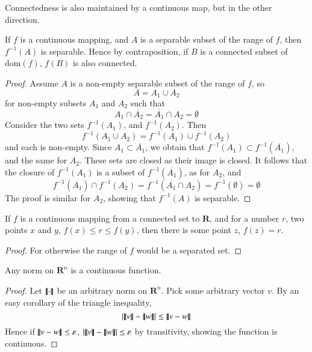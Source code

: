 Connectedness is also maintained by a continuous map, but in the other direction.

\begin{theorem}
  If $f$ is a continuous mapping, and $A$ is a separable subset of the range of $f$, then $f^{-1}(A)$ is separable. Hence by contraposition, if $B$ is a connected subset of $\text{dom}(f)$, $f(B)$ is also connected.
\end{theorem}
\begin{proof}
  Assume $A$ is a non-empty separable subset of the range of $f$, so
  \[ A = A_1 \cup A_2 \]
  for non-empty subsets $A_1$ and $A_2$ such that
  \[ A_1 \cap \overline{A_2} = \overline{A_1} \cap A_2 = \emptyset \]
  Consider the two sets $f^{-1}(A_1)$, and $f^{-1}(A_2)$. Then
  \[ f^{-1}(A_1 \cup A_2) = f^{-1}(A_1) \cup f^{-1}(A_2) \]
  and each is non-empty. Since $A_1 \subset \overline{A_1}$, we obtain that $f^{-1}(A_1) \subset f^{-1}(\overline{A_1})$, and the same for $A_2$. These sets are closed as their image is closed. It follows that the closure of $f^{-1}(A_1)$ is a subset of $f^{-1}(\overline{A_1})$, as for $A_2$, and
  \[ f^{-1}(\overline{A_1}) \cap f^{-1}(A_2) = f^{-1}(\overline{A_1} \cap A_2) = f^{-1}(\emptyset) = \emptyset \]
  The proof is similar for $A_2$, showing that $f^{-1}(A)$ is separable.
\end{proof}

\begin{corollary}
  If $f$ is a continuous mapping from a connected set to $\mathbf{R}$, and for a number $r$, two points $x$ and $y$, $f(x) \leq r \leq f(y)$, then there is some point $z$, $f(z) = r$.
\end{corollary}
\begin{proof}
  For otherwise the range of $f$ would be a separated set.
\end{proof}

\begin{lemma}Any norm on $\mathbf{R}^n$ is a continuous function.\end{lemma}
\begin{proof}
  Let ${\left\vert\kern-0.25ex\left\vert\kern-0.25ex\left\vert \cdot \right\vert\kern-0.25ex\right\vert\kern-0.25ex\right\vert}$ be an arbitrary norm on $\mathbf{R}^n$. Pick some arbitrary vector $v$. By an easy corollary of the triangle inequality,
  \[ |{\left\vert\kern-0.25ex\left\vert\kern-0.25ex\left\vert v \right\vert\kern-0.25ex\right\vert\kern-0.25ex\right\vert} - {\left\vert\kern-0.25ex\left\vert\kern-0.25ex\left\vert w \right\vert\kern-0.25ex\right\vert\kern-0.25ex\right\vert}| \leq {\left\vert\kern-0.25ex\left\vert\kern-0.25ex\left\vert v - w \right\vert\kern-0.25ex\right\vert\kern-0.25ex\right\vert} \]
  Hence if ${\left\vert\kern-0.25ex\left\vert\kern-0.25ex\left\vert v - w \right\vert\kern-0.25ex\right\vert\kern-0.25ex\right\vert} \leq \varepsilon$, $|{\left\vert\kern-0.25ex\left\vert\kern-0.25ex\left\vert v \right\vert\kern-0.25ex\right\vert\kern-0.25ex\right\vert} - {\left\vert\kern-0.25ex\left\vert\kern-0.25ex\left\vert w \right\vert\kern-0.25ex\right\vert\kern-0.25ex\right\vert}| \leq \varepsilon$ by transitivity, showing the function is continuous.
\end{proof}

